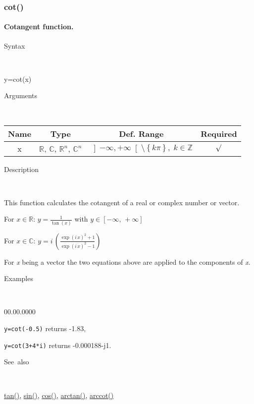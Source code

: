 \subsubsection*{\hypertarget{cot}{}{\Large cot()}}


\paragraph{\label{par:Cotangent}Cotangent function.}

\begin{description}
\item [Syntax]~
\end{description}
y=cot(x)

\begin{description}
\item [Arguments]~
\end{description}
\begin{tabular}{|c|c|c|c|}
\hline 
Name&
Type&
Def. Range&
Required\tabularnewline
\hline
\hline 
x&
$\mathbb{R}$, $\mathbb{C}$, $\mathbb{R}^{n}$, $\mathbb{C}^{n}$&
$\left]-\infty,+\infty\right[\setminus\left\{ k\pi\right\} ,\; k\in\mathbb{Z}$&
$\surd$\tabularnewline
\hline
\end{tabular}

\begin{description}
\item [Description]~
\end{description}
This function calculates the cotangent of a real or complex number
or vector.

\medskip{}
For $x\in\mathbb{R}$: $y={\displaystyle \frac{1}{\tan\left(x\right)}}$
with $y\in\left[-\infty,\,+\infty\right]$

\medskip{}
For $x\in\mathbb{C}$: $y=i\,{\displaystyle \left(\frac{\exp\left(i\, x\right)^{2}+1}{\exp\left(i\, x\right)^{2}-1}\right)}$
\medskip{}

For \textit{x} being a vector the two equations above are
applied to the components of \textit{x}.

\begin{description}
\item [Examples]~
\end{description}
\begin{lyxlist}{00.00.0000}
\item [\texttt{y=cot(-0.5)}]returns -1.83,
\item [\texttt{y=cot(3+4{*}i)}]returns -0.000188-j1.
\end{lyxlist}
\begin{description}
\item [See~also]~
\end{description}
\textcolor{blue}{\hyperlink{tan}{tan()}}\textcolor{black}{,} \textcolor{blue}{\hyperlink{sin}{sin()}}\textcolor{black}{,}
\textcolor{blue}{\hyperlink{cos}{cos()}}\textcolor{black}{,} \textcolor{blue}{\hyperlink{arctan}{arctan()}}\textcolor{black}{,}
\textcolor{blue}{\hyperlink{arccot}{arccot()}}


